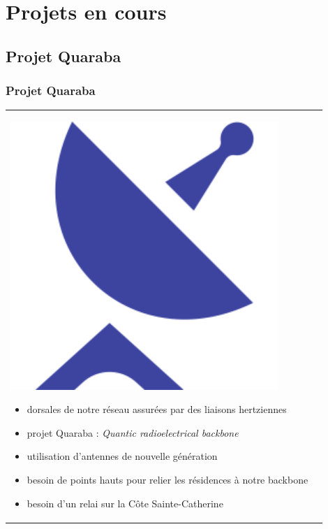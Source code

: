 \documentclass[handout]{beamer}
\begin{document}
	\section{Projets en cours}

	\subsection{Projet Quaraba}
		\begin{frame}
		\frametitle{Projet Quaraba}

		\begin{tabular}{l l}
			\begin{minipage}{0.2\textwidth}
				\begin{center}
					\includegraphics[width=0.9\textwidth]{images/antennes.png}
				\end{center}
			\end{minipage}

			\begin{minipage}{0.8\textwidth}
				\begin{itemize}
					\item dorsales de notre réseau assurées par des liaisons hertziennes
					\item projet Quaraba : \textit{Quantic radioelectrical backbone}
					\item utilisation d'antennes de nouvelle génération
					\item besoin de points hauts pour relier les résidences à notre backbone
					\item besoin d'un relai sur la Côte Sainte-Catherine
				\end{itemize}
			\end{minipage}
			
		\end{tabular}
		\end{frame}
\end{document}
